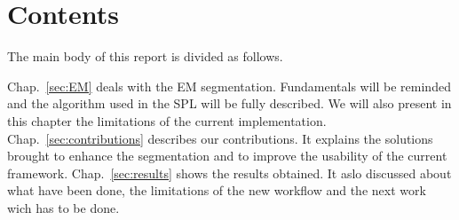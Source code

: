 \section{Contents}\label{intro:contents}
The main body of this report is divided as follows.
\par
Chap.~\ref{sec:EM} deals with the EM segmentation. Fundamentals will be reminded and the algorithm used in the SPL will be fully described. We will also present in this chapter the limitations of the current implementation.
Chap.~\ref{sec:contributions} describes our contributions. It explains the solutions brought to enhance the segmentation and to improve the usability of the current framework.
Chap.~\ref{sec:results} shows the results obtained. It aslo discussed about what have been done, the limitations of the new workflow and the next work wich has to be done.
%
